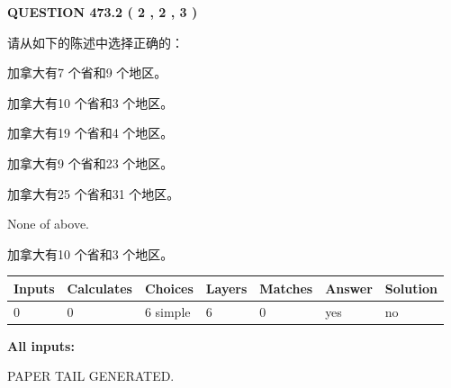 \documentclass{ctexart}
\begin{document}
   
  
\vspace{0.2in}
  
{\textbf{\Large{QUESTION
473.2 
 ( 2 , 2 , 3 )
}}}
  
  
请从如下的陈述中选择正确的：
 
 
加拿大有7 个省和9 个地区。
 
 
加拿大有10 个省和3 个地区。
 
 
加拿大有19 个省和4 个地区。
 
 
加拿大有9 个省和23 个地区。
 
 
加拿大有25 个省和31 个地区。
 
 
 None of above.
 
 
\noindent{}
 
 
加拿大有10 个省和3 个地区。
 
 
\noindent{}
 
 
   
   
   
   
\noindent\begin{tabular}{|l|l|l|l|l|l|l|}
 \hline
Inputs & Calculates & Choices & Layers & Matches & Answer & Solution \\ \hline
 0  & 
 0  & 
 6
  simple  
  & 
 6  & 
 0  & 
  yes & 
  no 
  \\ \hline
 \end{tabular}
   
   
   
   
\noindent{}
   
   
   
   
\noindent\vspace{0.1in}\hspace{-0.08in} {\textbf{\Large{All inputs: }}}
   
   
   
   
   
   
 \vspace{0.2in}
 
   
   
\vspace{2.0in} PAPER TAIL GENERATED.
   
\end{document}
